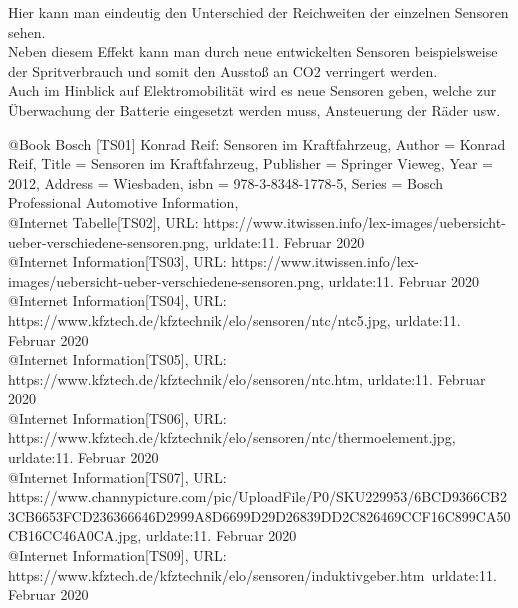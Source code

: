 			\begin{flushleft}
							
				Hier kann man eindeutig den Unterschied der Reichweiten der einzelnen Sensoren sehen.\\
				
				Neben diesem Effekt kann man durch neue entwickelten Sensoren beispielsweise der Spritverbrauch und somit den Ausstoß an CO2 verringert werden.\\
				Auch im Hinblick auf Elektromobilität wird es neue Sensoren geben, welche zur Überwachung der Batterie eingesetzt werden muss, Ansteuerung der Räder usw.
				
			\end{flushleft} 

@Book{ 
	Bosch [TS01] 
	Konrad Reif: 		Sensoren im Kraftfahrzeug,
	Author		= 		Konrad Reif,
	Title		=		Sensoren im Kraftfahrzeug,
	Publisher	=		Springer Vieweg,
	Year		=		2012,
	Address		=		Wiesbaden,
	isbn 		= 		978-3-8348-1778-5,
	Series 		=		{Bosch Professional Automotive Information},
}
\\

@Internet{ Tabelle[TS02],
	URL: https://www.itwissen.info/lex-images/uebersicht-ueber-verschiedene-sensoren.png,
	urldate:11. Februar 2020}
\\

@Internet{ Information[TS03],
	URL: https://www.itwissen.info/lex-images/uebersicht-ueber-verschiedene-sensoren.png,
	urldate:11. Februar 2020}
\\

@Internet{ Information[TS04],
	URL: https://www.kfztech.de/kfztechnik/elo/sensoren/ntc/ntc5.jpg,
	urldate:11. Februar 2020}
\\

@Internet{ Information[TS05],
	URL: https://www.kfztech.de/kfztechnik/elo/sensoren/ntc.htm,
	urldate:11. Februar 2020}
\\

@Internet{ Information[TS06],
	URL: https://www.kfztech.de/kfztechnik/elo/sensoren/ntc/thermoelement.jpg,
	urldate:11. Februar 2020}
\\

@Internet{ Information[TS07],
	URL: https://www.channypicture.com/pic/UploadFile/P0/SKU229953/6BCD9366CB23CB6653FCD236366646D2999A8D6699D29D26839DD2C826469CCF16C899CA50CB16CC46A0CA.jpg,
	urldate:11. Februar 2020}
\\

@Internet{ Information[TS09],
	URL: https://www.kfztech.de/kfztechnik/elo/sensoren/induktivgeber.htm\,
	urldate:11. Februar 2020}
\\

